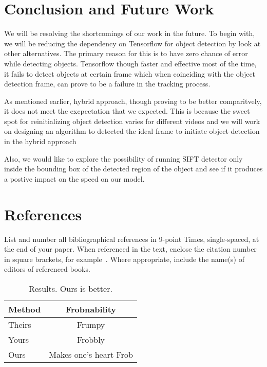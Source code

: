 \documentclass[10pt,twocolumn,letterpaper]{article}
\begin{document}

\section{Conclusion and Future Work}
We will be resolving the shortcomings of our work in the future. To begin with, we will be reducing the dependency on Tensorflow for object detection by look at other alternatives. The primary reason for this is to have zero chance of error while detecting objects. Tensorflow though faster and effective most of the time, it fails to detect objects at certain frame which when coinciding with the object detection frame, can prove to be a failure in the tracking process.

As mentioned earlier, hybrid approach, though proving to be better comparitvely, it does not meet the excpectation that we expected. This is because the sweet spot for reinitializing object detection varies for different videos and we will work on designing an algorithm to detected the ideal frame to initiate object detection in the hybrid approach

Also, we would like to explore the possibility of running SIFT detector only inside the bounding box of the detected region of the object and see if it produces a postive impact on the speed on our model.



\section{References}

List and number all bibliographical references in 9-point Times,
single-spaced, at the end of your paper. When referenced in the text,
enclose the citation number in square brackets, for
example~\cite{Authors14}.  Where appropriate, include the name(s) of
editors of referenced books.

\begin{table}
\begin{center}
\begin{tabular}{|l|c|}
\hline
Method & Frobnability \\
\hline\hline
Theirs & Frumpy \\
Yours & Frobbly \\
Ours & Makes one's heart Frob\\
\hline
\end{tabular}
\end{center}
\caption{Results.   Ours is better.}
\end{table}




\


{\small


}
\end{document}
